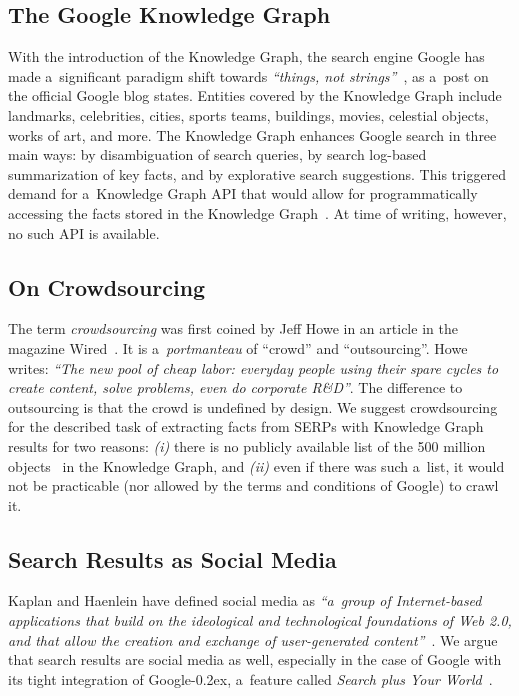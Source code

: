 \documentclass[runningheads,a4paper]{llncs}
\newcommand{\googleplus}{Google\nolinebreak\hspace{0em}\raisebox{.28ex}{\tiny\bf +}\kern-0.2ex\xspace}
\begin{document}
\subsection{The Google Knowledge Graph}
With the introduction of the Knowledge Graph, the search engine Google
has made a~significant paradigm shift towards \textit{``things, not strings''}~\cite{singhal2012_1},
as a~post on the official Google blog states.
Entities covered by the Knowledge Graph include landmarks, celebrities, cities, sports
teams, buildings, movies, celestial objects, works of art, and more.
The Knowledge Graph enhances Google search in three main ways:
by disambiguation of search queries,
by search log-based summarization of key facts,
and by explorative search suggestions.
This triggered demand for a~Knowledge Graph API that would allow for
programmatically accessing the facts stored in the Knowledge Graph~\cite{quora2012}.
At time of writing, however, no such API is available.

\subsection{On Crowdsourcing} \label{sec:on-crowdsourcing}
The term \emph{crowdsourcing} was first coined by Jeff Howe
in an article in the magazine Wired~\cite{howe2006}.
It is a~\textit{portmanteau} of ``crowd'' and ``outsourcing''.
Howe writes: \textit{``The new pool of cheap labor:
everyday people using their spare cycles to create content, solve problems,
even do corporate R\&D''}.
The difference to outsourcing is that the crowd is undefined by design.
We suggest crowdsourcing for the described task of extracting facts from
SERPs with Knowledge Graph results for two reasons:
\textit{(i)} there is no publicly available list
of the 500 million objects~\cite{singhal2012_1} in the Knowledge Graph, and
\textit{(ii)} even if there was such a~list,
it would not be practicable (nor allowed by the terms and conditions of Google)
to crawl it.

\subsection{Search Results as Social Media}
Kaplan and Haenlein have defined social media as
\textit{``a~group of Internet-based applications that build on the ideological and
technological foundations of Web 2.0, and that allow the creation and
exchange of user-generated content''}~\cite{kaplan2010}.
We argue that search results are social media as well,
especially in the case of Google with its tight integration of \googleplus,
a~feature called \emph{Search plus Your World}~\cite{singhal2012_2}.
\end{document}
